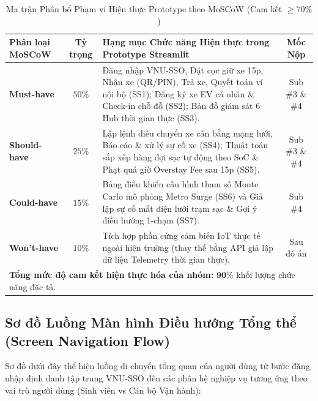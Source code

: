 \documentclass[12pt,a4paper]{article}
\begin{document}
\begin{table}[H]
    \centering
    \small
    \renewcommand{\arraystretch}{1.25}
    \caption{Ma trận Phân bổ Phạm vi Hiện thực Prototype theo MoSCoW (Cam kết $\ge 70\%$)}
    \label{tab:moscow-scope}
    \begin{tabularx}{\textwidth}{|l|c|X|c|}
        \hline
        \textbf{Phân loại MoSCoW} & \textbf{Tỷ trọng} & \textbf{Hạng mục Chức năng Hiện thực trong Prototype Streamlit} & \textbf{Mốc Nộp} \\
        \hline
        \textbf{Must-have} & $50\%$ & Đăng nhập VNU-SSO, Đặt cọc giữ xe 15p, Nhận xe (QR/PIN), Trả xe, Quyết toán ví nội bộ (SS1); Đăng ký xe EV cá nhân \& Check-in chỗ đỗ (SS2); Bản đồ giám sát 6 Hub thời gian thực (SS3). & Sub \#3 \& \#4 \\
        \hline
        \textbf{Should-have} & $25\%$ & Lập lệnh điều chuyển xe cân bằng mạng lưới, Báo cáo \& xử lý sự cố xe (SS4); Thuật toán sắp xếp hàng đợi sạc tự động theo SoC \& Phạt quá giờ Overstay Fee sau 15p (SS5). & Sub \#3 \& \#4 \\
        \hline
        \textbf{Could-have} & $15\%$ & Bảng điều khiển cấu hình tham số Monte Carlo mô phỏng Metro Surge (SS6) và Giả lập sự cố mất điện lưới trạm sạc \& Gợi ý điều hướng 1-chạm (SS7). & Sub \#4 \\
        \hline
        \textbf{Won't-have} & $10\%$ & Tích hợp phần cứng cảm biến IoT thực tế ngoài hiện trường (thay thế bằng API giả lập dữ liệu Telemetry thời gian thực). & Sau đồ án \\
        \hline
        \multicolumn{4}{|l|}{\textbf{Tổng mức độ cam kết hiện thực hóa của nhóm:} $\mathbf{90\%}$ khối lượng chức năng đặc tả.} \\
        \hline
    \end{tabularx}
\end{table}

\clearpage
\subsection{Sơ đồ Luồng Màn hình Điều hướng Tổng thể (Screen Navigation Flow)}
Sơ đồ dưới đây thể hiện luồng di chuyển tổng quan của người dùng từ bước đăng nhập định danh tập trung VNU-SSO đến các phân hệ nghiệp vụ tương ứng theo vai trò người dùng (Sinh viên vs Cán bộ Vận hành):
\end{document}

